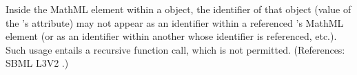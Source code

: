 Inside the  MathML element within a \FunctionDefinition object, the identifier of that object (\ie value of the \FunctionDefinition's  attribute) may not appear as an identifier within a referenced \FunctionDefinition's  MathML element (or as an identifier within another \FunctionDefinition whose identifier is referenced, etc.).  Such usage entails a recursive function call, which is not permitted.  (References: SBML L3V2 .)
